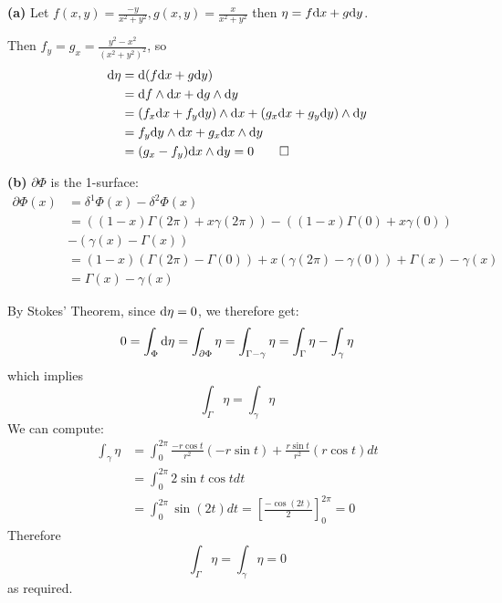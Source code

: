 \documentclass[a4paper, 12pt]{article}
\begin{document}
\begin{solution}
    \textbf{(a)} Let $f(x, y) = \frac{-y}{x^2 + y^2}, g(x, y) = \frac{x}{x^2 + y^2}$ then $\eta = f \mathrm{d} x + g \mathrm{d} y$.

    Then $f_y = g_x = \frac{y^2 - x^2}{(x^2 + y^2)^2}$, so 
    \begin{align*}
        \mathrm{d} \eta &= \mathrm{d} (f \mathrm{d} x + g \mathrm{d} y) \\
        &= \mathrm{d} f \wedge \mathrm{d} x + \mathrm{d} g \wedge \mathrm{d} y \\
        &= \left(f_x \mathrm{d} x + f_y \mathrm{d} y\right) \wedge \mathrm{d} x + \left(g_x \mathrm{d} x + g_y \mathrm{d} y\right) \wedge \mathrm{d} y \\
        &= f_y \mathrm{d} y \wedge \mathrm{d} x + g_x \mathrm{d} x \wedge \mathrm{d} y \\
        &= (g_x - f_y) \mathrm{d} x \wedge \mathrm{d} y = 0 \qed
    \end{align*}

    \textbf{(b)}
    $\partial \Phi$ is the 1-surface:
    \begin{align*}
        \partial \Phi (x) &= \delta^1 \Phi(x) - \delta^2 \Phi (x) \\
        &= ((1-x) \Gamma(2\pi) + x \gamma(2\pi)) - ((1-x) \Gamma(0) + x \gamma(0)) \\
        &- (\gamma(x) - \Gamma(x)) \\
        &= (1-x) (\Gamma(2\pi) - \Gamma(0)) + x(\gamma(2\pi) - \gamma(0)) + \Gamma(x) - \gamma(x) \\
        &= \Gamma(x) - \gamma(x)
    \end{align*}

    By Stokes' Theorem, since $\mathrm{d} \eta = 0$, we therefore get: 
    \begin{equation*}
        0 = \int_{\Phi} \mathrm{d} \eta = \int_{\partial \Phi} \eta = \int_{\Gamma - \gamma} \eta = \int_{\Gamma} \eta - \int_{\gamma} \eta
    \end{equation*}
    which implies \begin{equation*}
        \int_{\Gamma} \eta = \int_{\gamma} \eta
    \end{equation*}
We can compute: \begin{align*}
        \int_{\gamma} \eta &= \int_{0}^{2\pi} \frac{-r \cos t}{r^2} (-r \sin t) + \frac{r \sin t}{r^2} (r \cos t) dt \\
        &= \int_{0}^{2\pi} 2 \sin t \cos t dt \\
        &= \int_{0}^{2\pi} \sin (2t) dt = \left[\frac{-\cos (2t)}{2}\right]^{2\pi}_{0} = 0
    \end{align*}
    Therefore \begin{equation*}
        \int_{\Gamma} \eta = \int_{\gamma} \eta = 0
    \end{equation*}
    as required.
\end{solution}
\end{document}
